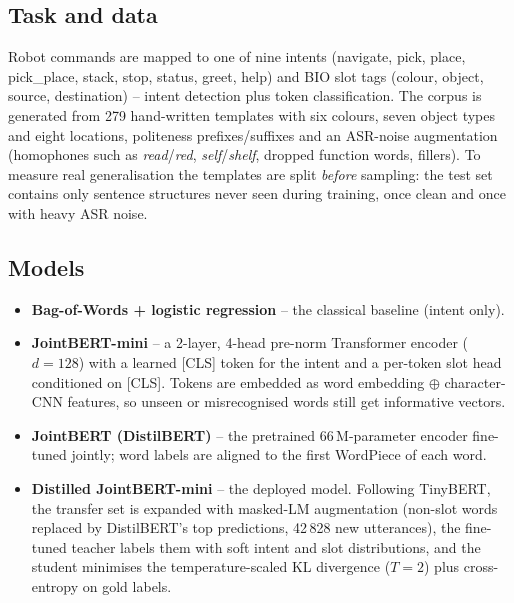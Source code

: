 \documentclass[11pt,a4paper]{article}
\begin{document}
\subsection{Task and data}
Robot commands are mapped to one of nine intents (navigate, pick, place, pick\_place, stack, stop,
status, greet, help) and BIO slot tags (colour, object, source, destination) -- intent detection plus
token classification. The corpus is generated from 279 hand-written templates with six colours, seven
object types and eight locations, politeness prefixes/suffixes and an ASR-noise augmentation
(homophones such as \emph{read}/\emph{red}, \emph{self}/\emph{shelf}, dropped function words, fillers).
To measure real generalisation the templates are split \emph{before} sampling: the test set contains only
sentence structures never seen during training, once clean and once with heavy ASR noise.

\subsection{Models}
\begin{itemize}
\item \textbf{Bag-of-Words + logistic regression} -- the classical baseline (intent only).
\item \textbf{JointBERT-mini} -- a 2-layer, 4-head pre-norm Transformer encoder ($d=128$) with a learned
[CLS] token for the intent and a per-token slot head conditioned on [CLS]. Tokens are embedded as word
embedding $\oplus$ character-CNN features, so unseen or misrecognised words still get informative vectors.
\item \textbf{JointBERT (DistilBERT)} -- the pretrained 66\,M-parameter encoder fine-tuned jointly;
word labels are aligned to the first WordPiece of each word.
\item \textbf{Distilled JointBERT-mini} -- the deployed model. Following TinyBERT, the transfer set is
expanded with masked-LM augmentation (non-slot words replaced by DistilBERT's top predictions, 42\,828
new utterances), the fine-tuned teacher labels them with soft intent and slot distributions, and the
student minimises the temperature-scaled KL divergence ($T=2$) plus cross-entropy on gold labels.
\end{itemize}
\end{document}
